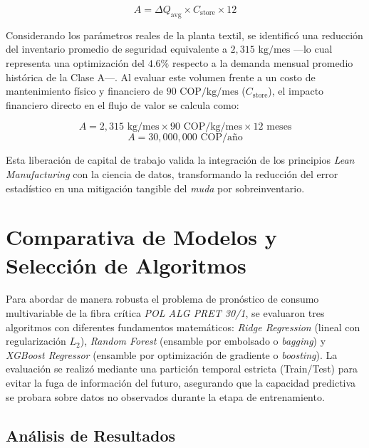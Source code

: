 \documentclass[conference,twoside]{IEEEtran}
\begin{document}
\begin{equation}
\label{eq:ahorro}
A = \Delta Q_{\text{avg}} \times C_{\text{store}} \times 12
\end{equation}

Considerando los parámetros reales de la planta textil, se identificó una reducción del inventario promedio de seguridad equivalente a $2,315\text{ kg/mes}$ —lo cual representa una optimización del $4.6\%$ respecto a la demanda mensual promedio histórica de la Clase A—. Al evaluar este volumen frente a un costo de mantenimiento físico y financiero de $90\text{ COP/kg/mes}$ ($C_{\text{store}}$), el impacto financiero directo en el flujo de valor se calcula como:

\begin{equation*}
A = 2,315\text{ kg/mes} \times 90\text{ COP/kg/mes} \times 12\text{ meses}
\end{equation*}
\begin{equation}
A = 30,000,000\text{ COP/año}
\end{equation}

Esta liberación de capital de trabajo valida la integración de los principios \textit{Lean Manufacturing} con la ciencia de datos, transformando la reducción del error estadístico en una mitigación tangible del \textit{muda} por sobreinventario.

\section{Comparativa de Modelos y Selección de Algoritmos}
\label{sec:comparativa}

Para abordar de manera robusta el problema de pronóstico de consumo multivariable de la fibra crítica \textit{POL ALG PRET 30/1}, se evaluaron tres algoritmos con diferentes fundamentos matemáticos: \textit{Ridge Regression} (lineal con regularización $L_2$), \textit{Random Forest} (ensamble por embolsado o \textit{bagging}) y \textit{XGBoost Regressor} (ensamble por optimización de gradiente o \textit{boosting}). La evaluación se realizó mediante una partición temporal estricta (Train/Test) para evitar la fuga de información del futuro, asegurando que la capacidad predictiva se probara sobre datos no observados durante la etapa de entrenamiento.

\subsection{Análisis de Resultados}
\label{subsec:analisis_resultados}
\end{document}
